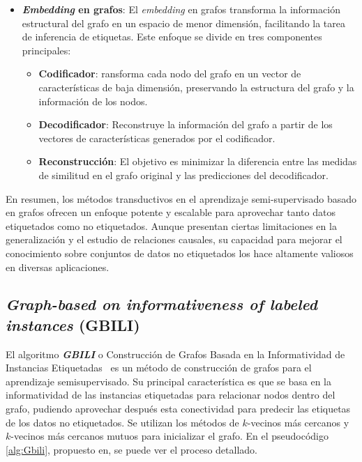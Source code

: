 \begin{itemize}
\begin{itemize}
	\end{itemize}
	\item \textbf{\textit{Embedding} en grafos}: El \textit{embedding} en grafos transforma la información estructural del grafo en un espacio de menor dimensión, facilitando la tarea de inferencia de etiquetas. Este enfoque se divide en tres componentes principales:
	\begin{itemize}
		\item \textbf{Codificador}: ransforma cada nodo del grafo en un vector de características de baja dimensión, preservando la estructura del grafo y la información de los nodos.
		\item \textbf{Decodificador}: Reconstruye la información del grafo a partir de los vectores de características generados por el codificador.
		\item \textbf{Reconstrucción}: El objetivo es minimizar la diferencia entre las medidas de similitud en el grafo original y las predicciones del decodificador.
	\end{itemize}
\end{itemize}

En resumen, los métodos transductivos en el aprendizaje semi-supervisado basado en grafos ofrecen un enfoque potente y escalable para aprovechar tanto datos etiquetados como no etiquetados. Aunque presentan ciertas limitaciones en la generalización y el estudio de relaciones causales, su capacidad para mejorar el conocimiento sobre conjuntos de datos no etiquetados los hace altamente valiosos en diversas aplicaciones.
\clearpage
\subsection{\textit{ Graph-based on informativeness of
labeled instances} (GBILI)}\label{sec3:gbili}
El algoritmo \textit{\textbf{GBILI}} o Construcción de Grafos Basada en la Informatividad de Instancias Etiquetadas~\cite{gbili} es un método de construcción de grafos para el aprendizaje semisupervisado. Su principal característica es que se basa en la informatividad de las instancias etiquetadas para relacionar nodos dentro del grafo, pudiendo aprovechar después esta conectividad para predecir las etiquetas de los datos no etiquetados. Se utilizan los métodos de $k$-vecinos más cercanos y  $k$-vecinos más cercanos mutuos para inicializar el grafo. En el pseudocódigo \ref{alg:Gbili}, propuesto en, se puede ver el proceso detallado.

